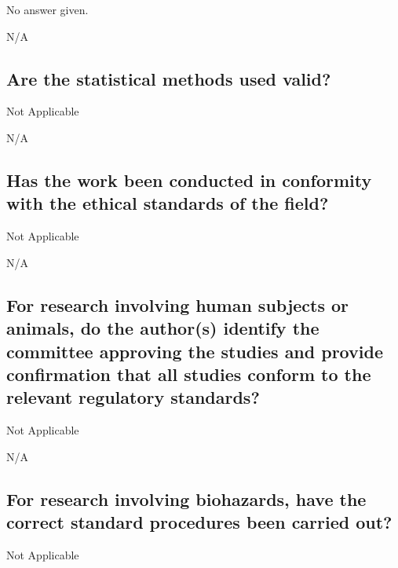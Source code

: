 \documentclass{article}
\begin{document}
No answer given.

\begin{shaded}
N/A
\end{shaded}


\subsection{Are the statistical methods used valid?}

Not Applicable

\begin{shaded}
N/A
\end{shaded}


\subsection{Has the work been conducted in conformity with the ethical
standards of the field?}

Not Applicable

\begin{shaded}
N/A
\end{shaded}


\subsection{For research involving human subjects or animals, do the
author(s) identify the committee approving the studies and provide confirmation
that all studies conform to the relevant regulatory standards?}

Not Applicable

\begin{shaded}
N/A
\end{shaded}


\subsection{For research involving biohazards, have the correct standard
procedures been carried out?}

Not Applicable
\end{document}
